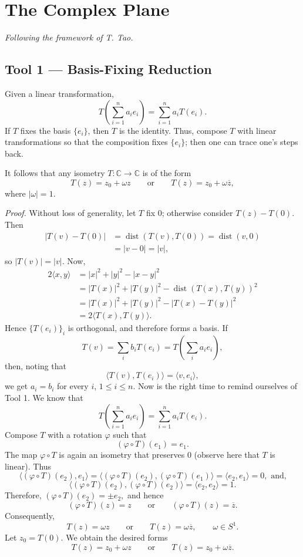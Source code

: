 \documentclass[11pt,a4paper]{article}
\begin{document}
\section*{The Complex Plane}
\textit{Following the framework of T. Tao.}

\subsection*{Tool 1 — Basis-Fixing Reduction}
Given a linear transformation,
\[
T\left(\sum_{i=1}^{n}a_i e_i\right)=\sum_{i=1}^{n}a_iT(e_i).
\]
If $T$ fixes the basis $\{e_i\}$, then $T$ is the identity. Thus, compose $T$ with linear transformations so that the composition fixes $\{e_i\}$; then one can trace one's steps back.

It follows that any isometry $T\colon\mathbb C\to\mathbb C$ is of the form
\[
T(z)=z_0+\omega z
\qquad\text{or}\qquad
T(z)=z_0+\omega\overline z,
\]
where $|\omega|=1$.


\textit{Proof.}
Without loss of generality, let $T$ fix $0$; otherwise consider $T(z)-T(0)$. Then
\begin{align*}
|T(v)-T(0)|
&=\operatorname{dist}(T(v),T(0))
 =\operatorname{dist}(v,0)\\
&=|v-0|=|v|,
\end{align*}
so $|T(v)|=|v|$. Now,
\begin{align*}
2\langle x,y\rangle
&=|x|^2+|y|^2-|x-y|^2\\
&=|T(x)|^2+|T(y)|^2-
  \operatorname{dist}(T(x),T(y))^2\\
&=|T(x)|^2+|T(y)|^2-|T(x)-T(y)|^2\\
&=2\langle T(x),T(y)\rangle.
\end{align*}
Hence $\{T(e_i)\}_i$ is orthogonal, and therefore forms a basis. If
\[
T(v)=\sum_i b_iT(e_i)=T\left(\sum_i a_ie_i\right),
\]
then, noting that
\[
\langle T(v),T(e_i)\rangle=\langle v,e_i\rangle,
\]
we get $a_i=b_i$ for every $i$, $1\leq i\leq n$. Now is the right time to remind ourselves of Tool 1. We know that
\[
T\left(\sum_{i=1}^{n}a_ie_i\right)=\sum_{i=1}^{n}a_iT(e_i).
\]
Compose $T$ with a rotation $\varphi$ such that
\[
(\varphi\circ T)(e_1)=e_1.
\]
The map $\varphi\circ T$ is again an isometry that preserves $0$ (observe here that $T$ is linear). Thus
\[
\langle(\varphi\circ T)(e_2),e_1\rangle
=\langle(\varphi\circ T)(e_2),(\varphi\circ T)(e_1)\rangle
 =\langle e_2,e_1\rangle=0, \text{ and,}
\]
\[
\langle(\varphi\circ T)(e_2),(\varphi\circ T)(e_2)\rangle
=\langle e_2,e_2\rangle=1.
\]
Therefore, \((\varphi\circ T)(e_2)=\pm e_2,\)
and hence
\[
(\varphi\circ T)(z)=z\qquad\text{or}\qquad
(\varphi\circ T)(z)=\overline z.
\]
Consequently,
\[
T(z)=\omega z\qquad\text{or}\qquad T(z)=\omega\overline z,
\qquad \omega\in S^1.
\]
Let $z_0=T(0)$. We obtain the desired forms
\[
T(z)=z_0+\omega z
\qquad\text{or}\qquad
T(z)=z_0+\omega\overline z.
\]
\end{document}
